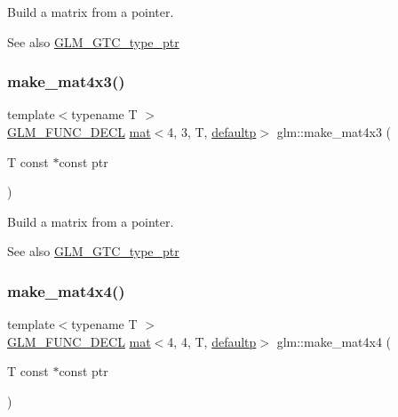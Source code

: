 Build a matrix from a pointer. \begin{DoxySeeAlso}{See also}
\hyperlink{group__gtc__type__ptr}{G\+L\+M\+\_\+\+G\+T\+C\+\_\+type\+\_\+ptr} 
\end{DoxySeeAlso}
\mbox{\label{group__gtc__type__ptr_ga0330bf6640092d7985fac92927bbd42b}} 
\subsubsection{\texorpdfstring{make\+\_\+mat4x3()}{make\_mat4x3()}}
{\footnotesize\ttfamily template$<$typename T $>$ \\
\hyperlink{setup_8hpp_ab2d052de21a70539923e9bcbf6e83a51}{G\+L\+M\+\_\+\+F\+U\+N\+C\+\_\+\+D\+E\+CL} \hyperlink{structglm_1_1mat}{mat}$<$4, 3, T, \hyperlink{namespaceglm_a36ed105b07c7746804d7fdc7cc90ff25a9d21ccd8b5a009ec7eb7677befc3bf51}{defaultp}$>$ glm\+::make\+\_\+mat4x3 (\begin{DoxyParamCaption}\item[{T const $\ast$const}]{ptr }\end{DoxyParamCaption})}

Build a matrix from a pointer. \begin{DoxySeeAlso}{See also}
\hyperlink{group__gtc__type__ptr}{G\+L\+M\+\_\+\+G\+T\+C\+\_\+type\+\_\+ptr} 
\end{DoxySeeAlso}
\mbox{\label{group__gtc__type__ptr_ga8f084be30e404844bfbb4a551ac2728c}} 
\subsubsection{\texorpdfstring{make\+\_\+mat4x4()}{make\_mat4x4()}}
{\footnotesize\ttfamily template$<$typename T $>$ \\
\hyperlink{setup_8hpp_ab2d052de21a70539923e9bcbf6e83a51}{G\+L\+M\+\_\+\+F\+U\+N\+C\+\_\+\+D\+E\+CL} \hyperlink{structglm_1_1mat}{mat}$<$4, 4, T, \hyperlink{namespaceglm_a36ed105b07c7746804d7fdc7cc90ff25a9d21ccd8b5a009ec7eb7677befc3bf51}{defaultp}$>$ glm\+::make\+\_\+mat4x4 (\begin{DoxyParamCaption}\item[{T const $\ast$const}]{ptr }\end{DoxyParamCaption})}

